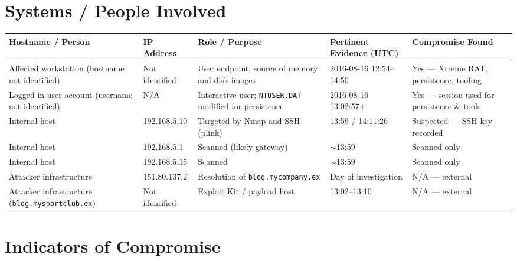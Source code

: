 \documentclass[12pt]{article}
\begin{document}
\clearpage
\section{Systems / People Involved}

\begin{longtable}{L{3.0cm} L{2.2cm} L{3.4cm} L{2.8cm} L{2.4cm}}
\toprule
\textbf{Hostname / Person} & \textbf{IP Address} & \textbf{Role / Purpose} & \textbf{Pertinent Evidence (UTC)} & \textbf{Compromise Found}\\
\midrule
\endhead
Affected workstation (hostname not identified) & Not identified & User endpoint; source of memory and disk images & 2016-08-16 12:54--14:50 & Yes --- Xtreme RAT, persistence, tooling\\
Logged-in user account (username not identified) & N/A & Interactive user; \texttt{NTUSER.DAT} modified for persistence & 2016-08-16 13:02:57+ & Yes --- session used for persistence \& tools\\
Internal host & 192.168.5.10 & Targeted by Nmap and SSH (plink) & 13:59 / 14:11:26 & Suspected --- SSH key recorded\\
Internal host & 192.168.5.1 & Scanned (likely gateway) & $\sim$13:59 & Scanned only\\
Internal host & 192.168.5.15 & Scanned & $\sim$13:59 & Scanned only\\
Attacker infrastructure & 151.80.137.2 & Resolution of \texttt{blog.mycompany.ex} & Day of investigation & N/A --- external\\
Attacker infrastructure (\texttt{blog.mysportclub.ex}) & Not identified & Exploit Kit / payload host & 13:02--13:10 & N/A --- external\\
\bottomrule
\end{longtable}

\section{Indicators of Compromise}
\end{document}
